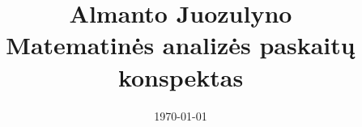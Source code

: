 \documentclass[a4paper]{report}
\title{%
Almanto Juozulyno\\
Matematinės analizės paskaitų konspektas}
\author{}
\date{\today}
\theoremstyle{plain}
\theoremstyle{definition}
\theoremstyle{remark}
\theoremstyle{notation}
\begin{document}
\maketitle
\bigskip
\tableofcontents
\end{document}
